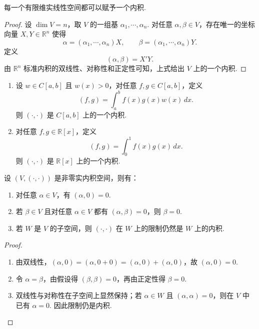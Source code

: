 \begin{proposition}
	每一个有限维实线性空间都可以赋予一个内积.
\end{proposition}
\begin{proof}
	设 $\dim V=n$，取 $V$ 的一组基 $\alpha_1,\cdots,\alpha_n$. 对任意 $\alpha,\beta\in V$，存在唯一的坐标向量 $X,Y\in\mathbb{R}^n$ 使得
	\[
	\alpha=(\alpha_1,\cdots,\alpha_n)X,
	\qquad
	\beta=(\alpha_1,\cdots,\alpha_n)Y.
	\]
	定义
	\[
	(\alpha,\beta)=X'Y.
	\]
	由 $\mathbb{R}^n$ 标准内积的双线性、对称性和正定性可知，上式给出 $V$ 上的一个内积.
\end{proof}

\begin{example}
	\begin{enumerate}
		\item 设 $w\in C[a,b]$ 且 $w(x)>0$，对任意 $f,g\in C[a,b]$，定义
		\[
		(f,g)=\int_a^b f(x)g(x)w(x)\,dx.
		\]
		则 $(\cdot,\cdot)$ 是 $C[a,b]$ 上的一个内积.
		\item 对任意 $f,g\in\mathbb{R}[x]$，定义
		\[
		(f,g)=\int_0^1 f(x)g(x)\,dx.
		\]
		则 $(\cdot,\cdot)$ 是 $\mathbb{R}[x]$ 上的一个内积.
	\end{enumerate}
	
\end{example}


\begin{lemma}
	设 $(V,(\cdot,\cdot))$ 是非零实内积空间，则有：
	\begin{enumerate}
		\item 对任意 $\alpha\in V$，有 $(\alpha,0)=0$.
		\item 若 $\beta\in V$ 且对任意 $\alpha\in V$ 都有 $(\alpha,\beta)=0$，则 $\beta=0$.
		\item 若 $W$ 是 $V$ 的子空间，则 $(\cdot,\cdot)$ 在 $W$ 上的限制仍然是 $W$ 上的内积.
	\end{enumerate}
\end{lemma}
\begin{proof}
	\begin{enumerate}
		\item 由双线性，$(\alpha,0)=(\alpha,0+0)=(\alpha,0)+(\alpha,0)$，故 $(\alpha,0)=0$.
		\item 令 $\alpha=\beta$，由假设得 $(\beta,\beta)=0$，再由正定性得 $\beta=0$.
		\item 双线性与对称性在子空间上显然保持；若 $\alpha\in W$ 且 $(\alpha,\alpha)=0$，则在 $V$ 中已有 $\alpha=0$. 因此限制仍是内积.
	\end{enumerate}
\end{proof}



